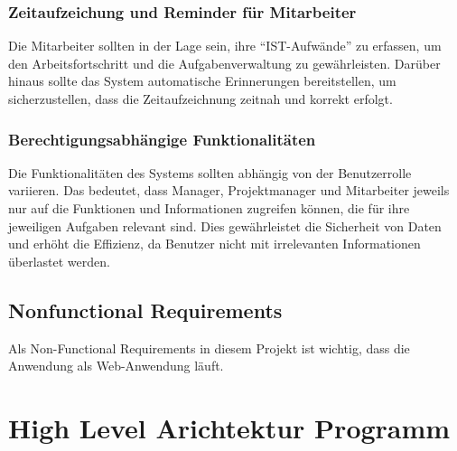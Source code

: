 \documentclass{article}
\begin{document}
        \subsubsection{Zeitaufzeichung und Reminder für Mitarbeiter}
        Die Mitarbeiter sollten in der Lage sein, ihre “IST-Aufwände” zu erfassen, um den Arbeitsfortschritt und die Aufgabenverwaltung zu gewährleisten. Darüber hinaus sollte das System automatische Erinnerungen bereitstellen, um sicherzustellen, dass die Zeitaufzeichnung zeitnah und korrekt erfolgt.
        \subsubsection{Berechtigungsabhängige Funktionalitäten}
        Die Funktionalitäten des Systems sollten abhängig von der Benutzerrolle variieren. Das bedeutet, dass Manager, Projektmanager und Mitarbeiter jeweils nur auf die Funktionen und Informationen zugreifen können, die für ihre jeweiligen Aufgaben relevant sind. Dies gewährleistet die Sicherheit von Daten und erhöht die Effizienz, da Benutzer nicht mit irrelevanten Informationen überlastet werden.
    \subsection{ Nonfunctional Requirements}
    Als Non-Functional Requirements in diesem Projekt ist wichtig, dass die Anwendung als Web-Anwendung läuft.

\newpage

\section{High Level Arichtektur Programm}
\end{document}
